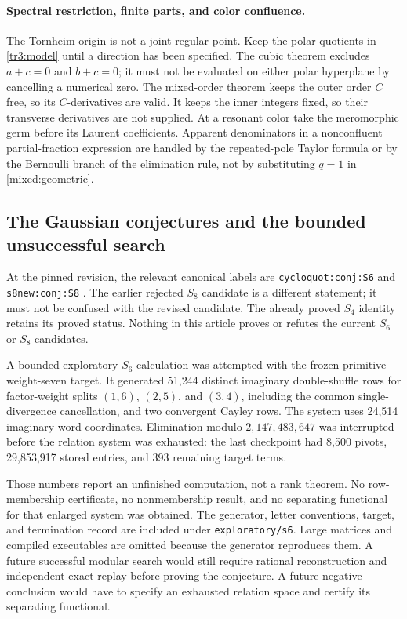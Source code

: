 \documentclass[11pt]{article}
\numberwithin{equation}{section}
\theoremstyle{plain}
\theoremstyle{definition}
\theoremstyle{remark}
\newcommand{\src}[1]{\nolinkurl{#1}}
\begin{document}
\paragraph{Spectral restriction, finite parts, and color confluence.}
The Tornheim origin is not a joint regular point. Keep the polar
quotients in \eqref{tr3:model} until a direction has been specified.
The cubic theorem excludes $a+c=0$ and $b+c=0$; it must not be
evaluated on either polar hyperplane by cancelling a numerical zero.
The mixed-order theorem keeps the outer order $C$ free, so its
$C$-derivatives are valid. It keeps the inner integers fixed, so their
transverse derivatives are not supplied. At a resonant color take
the meromorphic germ before its Laurent coefficients. Apparent
denominators in a nonconfluent partial-fraction expression are handled
by the repeated-pole Taylor formula or by the Bernoulli branch of the
elimination rule, not by substituting $q=1$ in \eqref{mixed:geometric}.

\subsection{The Gaussian conjectures and the bounded unsuccessful search}

At the pinned revision, the relevant canonical labels are
\src{cycloquot:conj:S6} and \src{s8new:conj:S8} \cite{RepoMain}.
The earlier rejected $S_8$ candidate is a different statement; it
must not be confused with the revised candidate. The already proved
$S_4$ identity retains its proved status. Nothing in this article
proves or refutes the current $S_6$ or $S_8$ candidates.

A bounded exploratory $S_6$ calculation was attempted with the frozen
primitive weight-seven target. It generated 51,244 distinct imaginary
double-shuffle rows for factor-weight splits $(1,6)$, $(2,5)$, and
$(3,4)$, including the common single-divergence cancellation, and two
convergent Cayley rows. The system uses 24,514 imaginary word
coordinates. Elimination modulo $2,147,483,647$ was interrupted before
the relation system was exhausted: the last checkpoint had 8,500
pivots, 29,853,917 stored entries, and 393 remaining target terms.

Those numbers report an unfinished computation, not a rank theorem.
No row-membership certificate, no nonmembership result, and no
separating functional for that enlarged system was obtained. The
generator, letter conventions, target, and termination record are
included under \src{exploratory/s6}. Large matrices and compiled
executables are omitted because the generator reproduces them.
A future successful modular search would still require rational
reconstruction and independent exact replay before proving the
conjecture. A future negative conclusion would have to specify an
exhausted relation space and certify its separating functional.
\end{document}
